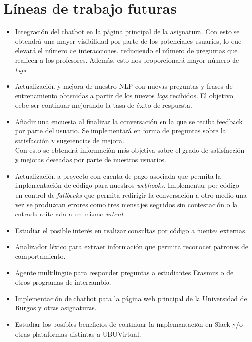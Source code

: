 \newpage
\section{Líneas de trabajo futuras}
\begin{itemize}
	\tightlist
	\item
	Integración del chatbot en la página principal de la asignatura. Con esto se obtendrá una mayor visibilidad por parte de los potenciales usuarios, lo que elevará el número de interacciones, reduciendo el número de preguntas que realicen a los profesores. Además, esto nos proporcionará mayor número de \textit{logs}. 
	\newline
	\item
	Actualización y mejora de nuestro NLP con nuevas preguntas y frases de entrenamiento obtenidas a partir de los nuevos \textit{logs} recibidos. El objetivo debe ser continuar mejorando la tasa de éxito de respuesta. 
	\newline
	\item
	Añadir una encuesta al finalizar la conversación en la que se reciba feedback por parte del usuario. Se implementará en forma de preguntas sobre la satisfacción y sugerencias de mejora.\\
	Con esto se obtendrá información más objetiva sobre el grado de satisfacción y mejoras deseadas por parte de nuestros usuarios.
	\newline
	\item
	Actualización a proyecto con cuenta de pago asociada que permita la implementación de código para nuestros \textit{webhooks}. Implementar por código un control de \textit{fallbacks} que permita redirigir la conversación a otro medio una vez se produzcan errores como tres mensajes seguidos sin contestación o la entrada reiterada a un mismo \textit{intent}.
	\newline
	\item 
	Estudiar el posible interés en realizar consultas por código a fuentes externas.
	\newline
	\item
	Analizador léxico para extraer información que permita reconocer patrones de comportamiento.
	\newline
	\item 
	Agente multilingüe para responder preguntas a estudiantes Erasmus o de otros programas de intercambio.
	\newline
	\item
	Implementación de chatbot para la página web principal de la Universidad de Burgos y otras asignaturas.
	\newline
	\item
	Estudiar los posibles beneficios de continuar la implementación en Slack y/o otras plataformas distintas a UBUVirtual.
	
\end{itemize}